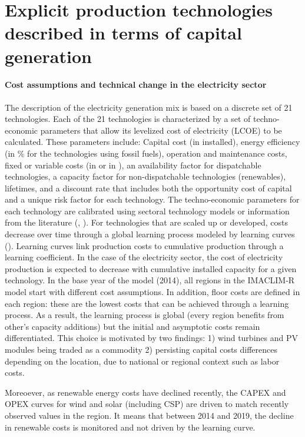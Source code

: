 \section{Explicit production technologies described in terms of capital generation}

\paragraph{ Cost assumptions and technical change in the electricity sector}

The description of the electricity generation mix is based on a discrete set of  21  technologies. Each of the  21  technologies is characterized by a set of techno-economic parameters that allow its levelized cost of electricity (LCOE) to be calculated. These parameters include: Capital cost (in \kw  installed), energy efficiency (in \% for the technologies using fossil fuels), operation and maintenance costs, fixed or variable costs (in \kw or in \kwh), an availability factor for dispatchable technologies, a capacity factor for non-dispatchable technologies (renewables), lifetimes, and a discount rate that includes both the opportunity cost of capital and a unique risk factor for each technology.
The techno-economic parameters for each technology are calibrated using sectoral technology models or information from the literature (\cite{IEA2020}, \cite{IRENA2020}).
For technologies that are scaled up or developed, costs decrease over time through a global learning process modeled by learning curves (\cite{Neij2008}). Learning curves link production costs to cumulative production through a learning coefficient. In the case of the electricity sector, the cost of electricity production is expected to decrease with cumulative installed capacity for a given technology. In the base year of the model (2014), all regions in the IMACLIM-R model start with different cost assumptions. In addition, floor costs are defined in each region: these are the lowest costs that can be achieved through a learning process. As a result, the learning process is global (every region benefits from other's capacity additions) but the initial and asymptotic costs remain differentiated. This choice is motivated by two findings: 1) wind turbines and PV modules being traded as a commodity 2) persisting capital costs differences depending on the location, due to national or regional context such as labor costs.

Moreoever, as renewable energy costs have declined recently, the CAPEX and OPEX curves for wind and solar (including CSP) are driven to match recently observed values in the region. It means that between 2014 and 2019, the decline in renewable costs is monitored and not driven by the learning curve.

